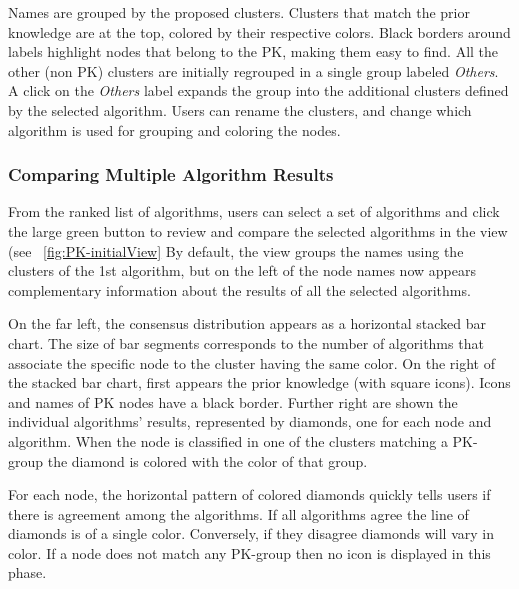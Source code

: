 
Names are grouped by the proposed clusters. Clusters that match the prior knowledge are at the top, colored by their respective colors.  Black borders around labels highlight nodes that belong to the PK, making them easy to find.   All the other (non PK) clusters are initially regrouped in a single group labeled \textit{Others}.
A click on the \textit{Others} label expands the group into the additional clusters defined by the selected algorithm.
Users can rename the clusters, and change which algorithm is used for grouping and coloring the nodes.

\subsubsection{Comparing Multiple Algorithm Results}

From the ranked list of algorithms, users can select a set of algorithms and click the large green button to review and compare the selected algorithms in the \paovis view (see ~\autoref{fig:PK-initialView}
By default, the \paovis view groups the names using the clusters of the 1st algorithm, but on the left of the node names now appears complementary information about the results of all the selected algorithms.

On the far left, the consensus distribution appears as a horizontal stacked bar chart. The size of bar segments corresponds to the number of algorithms that associate the specific node to the cluster having the same color. On the right of the stacked bar chart, first appears the prior knowledge (with square icons). Icons and names of PK nodes have a black border. Further right are shown the individual algorithms' results, represented by diamonds, one for each node and algorithm. When the node is classified in one of the clusters matching a PK-group the diamond is colored with the color of that group.


For each node, the horizontal pattern of colored diamonds quickly tells users if there is agreement among the algorithms. If all algorithms agree the line of diamonds is of a single color. Conversely, if they disagree diamonds will vary in color. If a node does not match any PK-group then no icon is displayed in this phase.

